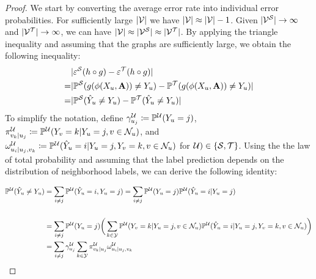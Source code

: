 \decomposeerror*


\begin{proof}
     
    We start by converting the average error rate into individual error probabilities. For sufficiently large $|\node|$ we have $|\node|\approx |\node|-1$. Given $|\nodes|\rightarrow\infty$ and $|\nodet|\rightarrow\infty$, we can have $|\node|\approx |\nodes| \approx |\nodet|$. By applying the triangle inequality and assuming that the graphs are sufficiently large, we obtain the following inequality:
    \begin{align*}
        &\abs{\errors(h \circ g) - \errort(h \circ g)} \\
       = &\abs{\probs(g(\phi(X_u, \rmA))\neq Y_u) - \probt(g(\phi(X_u, \rmA))\neq Y_u)}\\
       =&\abs{ \probs(\predy_u \neq \rvY_u) -  \probt(\predy_u \neq \rvY_u)} \\
    \end{align*}
To simplify the notation, define $\gammau{u_j}\coloneq \probu(\rvY_u=j)$, $\piu{v_k|u_j} \coloneq \probu(\rvY_{v}=k | \rvY_u=j, v\in \neighbor_u )$, and $\omegau{u_i|u_j,v_k}\coloneq \probu(\predy_u=i| \rvY_u=j, \rvY_{v}=k, v\in \neighbor_u)$ for $\mathcal{U}) \in \cbrace*{\mathcal{S}, \mathcal{T}}$. Using the the law of total probability and assuming that the label prediction depends on the distribution of neighborhood labels, we can derive the following identity:

\begin{align*}
    \probu(\predy_u \neq \rvY_u) &= \sum_{i\neq j}\probu(\predy_u=i, \rvY_u=j)= \sum_{i\neq j}\probu(\rvY_u=j) \probu(\predy_u=i| \rvY_u=j)\\
    \\
      &=\sum_{i\neq j}\probu(\rvY_u=j)  \bigg(\sum_{k\in\mathcal{Y}}  \probu(\rvY_{v}=k | \rvY_u=j, v\in \neighbor_u )
        \probu(\predy_u=i| \rvY_u=j, \rvY_{v}=k, v\in \neighbor_u) \bigg)\\
    &=\sum_{i\neq j}\gammau{u_j}\sum_{k\in\mathcal{Y}}\piu{v_k|u_j}\omegau{u_i|u_j,v_k}
\end{align*}


\end{proof}
